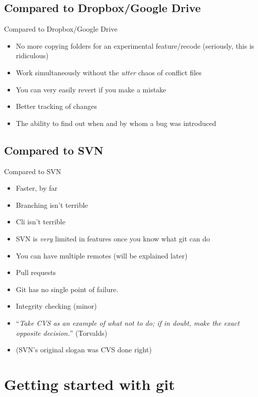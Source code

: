 \documentclass[10pt,a4paper]{beamer}
\begin{document}
\subsection{Compared to Dropbox/Google Drive}
\begin{frame}{Compared to Dropbox/Google Drive}
\begin{itemize}
\item No more copying folders for an experimental feature/recode (seriously, this is ridiculous)
\item Work simultaneously without the \textit{utter} chaos of conflict files
\item You can very easily revert if you make a mistake
\item Better tracking of changes
\item The ability to find out when and by whom a bug was introduced
\end{itemize}
\end{frame}

\subsection{Compared to SVN}
\begin{frame}{Compared to SVN}
\begin{itemize}
\item Faster, by far
\item Branching isn't terrible
\item Cli isn't terrible
\item SVN is \textit{very} limited in features once you know what git can do
\item You can have multiple remotes (will be explained later)
\item Pull requests
\item Git has no single point of failure.
\item Integrity checking (minor)
\item ``\textit{Take CVS as an example of what not to do; if in doubt, make the exact opposite decision.}'' (Torvalds)
\item (SVN's original slogan was CVS done right)

\end{itemize}
\end{frame}


\section{Getting started with git}
\end{document}
